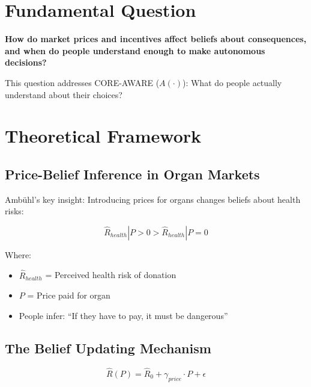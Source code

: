 \section{Fundamental Question}

\begin{tcolorbox}[colback=yellow!10!white,colframe=orange!75!black,title=Central Research Question]
\textbf{How do market prices and incentives affect beliefs about consequences, and when do people understand enough to make autonomous decisions?}
\end{tcolorbox}

This question addresses CORE-AWARE ($A(\cdot)$): What do people actually understand about their choices?

\section{Theoretical Framework}

\subsection{Price-Belief Inference in Organ Markets}

Ambühl's key insight: Introducing prices for organs changes beliefs about health risks:

\begin{equation}
\hat{R}_{health} | P > 0 > \hat{R}_{health} | P = 0
\end{equation}

Where:
\begin{itemize}
    \item $\hat{R}_{health}$ = Perceived health risk of donation
    \item $P$ = Price paid for organ
    \item People infer: ``If they have to pay, it must be dangerous''
\end{itemize}

\subsection{The Belief Updating Mechanism}

\begin{equation}
\hat{R}(P) = \hat{R}_0 + \gamma_{price} \cdot P + \epsilon
\end{equation}

